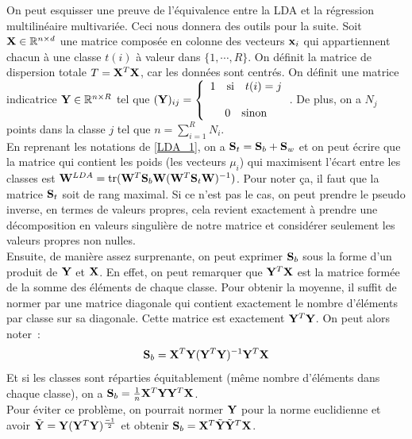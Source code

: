 \documentclass[12pt]{article}
\DeclareMathOperator{\trace}{tr}
\begin{document}
On peut esquisser une preuve de l'équivalence entre la LDA et la régression multilinéaire multivariée. Ceci nous donnera des outils pour la suite.
Soit ${\bf X} \in \mathbb{R}^{n \times d}$ une matrice composée en colonne des vecteurs ${\bf x}_i$ qui appartiennent chacun à une classe $t(i)$ à valeur dans $\{1, \cdots, R\}$. On définit la matrice de dispersion totale $T = {\bf X}^T{\bf X}$, car les données sont centrés. On définit une matrice indicatrice ${\bf Y} \in \mathbb{R}^{n \times R}$ tel que  $({\bf Y})_{ij} = \left\{ 
\begin{array}{cc}
1 \quad \text{si} \quad t(i) = j\\
\\
0 \quad \text{sinon}
\end{array}
\right.$. De plus, on a $N_j$ points dans la classe $j$ tel que $n = \sum_{i= 1}^{R} N_i$.\\
En reprenant les notations de \ref{LDA_1}, on a ${\bf S}_t = {\bf S}_b + {\bf S}_w$ et on peut écrire que la matrice qui contient les poids (les vecteurs $\mu_i$) qui maximisent l'écart entre les classes est ${\bf W}^{LDA} = \trace({\bf W}^T {\bf S}_b{\bf W}({\bf W}^T{\bf S}_t{\bf W})^{-1})$. Pour noter ça, il faut que la matrice ${\bf S}_t$ soit de rang maximal. Si ce n'est pas le cas, on peut prendre le pseudo inverse, en termes de valeurs propres, cela revient exactement à prendre une décomposition en valeurs singulière de notre matrice et considérer seulement les valeurs propres non nulles.\\

Ensuite, de manière assez surprenante, on peut exprimer ${\bf S}_b$ sous la forme d'un produit de ${\bf Y}$ et ${\bf X}$. En effet, on peut remarquer que ${\bf Y}^T{\bf X}$ est la matrice formée de la somme des éléments de chaque classe. Pour obtenir la moyenne, il suffit de normer par une matrice diagonale qui contient exactement le nombre d'éléments par classe sur sa diagonale. Cette matrice est exactement ${\bf Y}^T{\bf Y}$. On peut alors noter~:
$$
{\bf S}_b = {\bf X}^T{\bf Y} ({\bf Y}^T{\bf Y})^{-1}{\bf Y}^T{\bf X}
$$
Et si les classes sont réparties équitablement (même nombre d'éléments dans chaque classe), on a ${\bf S}_b = \frac{1}{n}{\bf X}^T{\bf Y}{\bf Y}^T{\bf X}$.\\
Pour éviter ce problème, on pourrait normer ${\bf Y}$ pour la norme euclidienne et avoir $\tilde{\bf Y} = {\bf Y}({\bf Y}^T{\bf Y})^{\frac{-1}{2}}$ et obtenir ${\bf S}_b = {\bf X}^T\tilde{\bf Y}\tilde{\bf Y}^T{\bf X}$.\\
\end{document}
